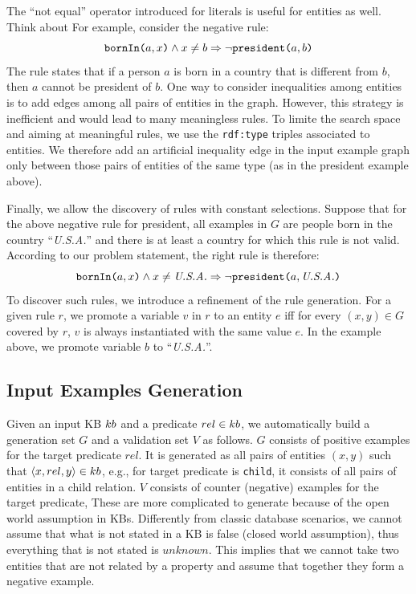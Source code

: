 \vspace{0.5ex}
The ``not equal'' operator introduced for literals is useful for entities as well. Think about 
For example, consider the negative rule:
$$ \texttt{bornIn(}a,x\texttt{)} \wedge x \neq b \Rightarrow \neg \texttt{president(}a,b\texttt{)} $$
The rule states that if a person $a$ is born in a country that is different from $b$, then $a$ cannot be president of $b$.
One way to consider inequalities among entities is to add edges among all pairs of entities in the graph. However, this strategy is inefficient and would lead to many meaningless rules. To limite the search space and aiming at meaningful rules, we use the \texttt{rdf:type} triples associated to entities. We therefore add an artificial inequality edge in the input example graph only between those pairs of entities of the same type (as in the president example above). %

\vspace{0.5ex}
Finally, we allow the discovery of rules with constant selections. %
Suppose that for the above negative rule for president, all examples in $G$ are people born in the country ``\textit{U.S.A.}'' and there is at least a country for which this rule is not valid. According to our problem statement, the right rule is therefore:
%
$$ \texttt{bornIn(}a,x\texttt{)} \wedge x \neq \emph{U.S.A.} \Rightarrow \neg \texttt{president(}a,\emph{U.S.A.}\texttt{)} $$
%
To discover such rules, we introduce a refinement of the rule generation.
For a given rule $r$, we promote a variable $v$ in $r$ to an entity $e$ iff for every $(x,y) \in G$ covered by $r$, $v$ is always instantiated with the same value $e$. In the example above, we promote variable $b$ to  ``\textit{U.S.A.}''.%


\subsection{Input Examples Generation} \label{sec:ex_generation}
Given an input KB ${\sc kb}$ and a predicate $rel \in {\sc kb}$, we automatically build a generation set $G$ and a validation set $V$ as follows. 
$G$ consists of positive examples for the target predicate $rel$. It is generated as all pairs of entities $(x,y)$ such that $\langle x,rel,y\rangle \in {\sc kb}$, e.g., for target predicate is \texttt{child}, it consists of all pairs of entities in a child relation.
$V$ consists of counter (negative) examples for the target predicate,
These are more complicated to generate because of the open world assumption in KBs. 
Differently from classic database scenarios, we cannot assume that what is not stated in a KB is false (closed world assumption), thus everything that is not stated is $unknown$.%
This implies that we cannot take two entities that are not related by a property and assume that together they form a negative example. 
 
